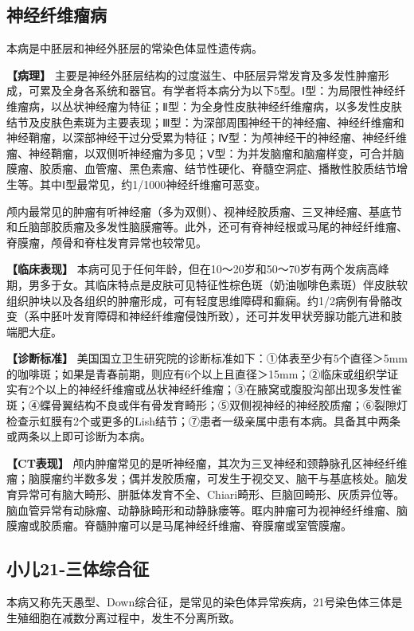 \subsection{神经纤维瘤病}

本病是中胚层和神经外胚层的常染色体显性遗传病。

\textbf{【病理】}
主要是神经外胚层结构的过度滋生、中胚层异常发育及多发性肿瘤形成，可累及全身各系统和器官。有学者将本病分为以下5型。Ⅰ型：为局限性神经纤维瘤病，以丛状神经瘤为特征；Ⅱ型：为全身性皮肤神经纤维瘤病，以多发性皮肤结节及皮肤色素斑为主要表现；Ⅲ型：为深部周围神经干的神经瘤、神经纤维瘤和神经鞘瘤，以深部神经干过分受累为特征；Ⅳ型：为颅神经干的神经瘤、神经纤维瘤、神经鞘瘤，以双侧听神经瘤为多见；Ⅴ型：为并发脑瘤和脑瘤样变，可合并脑膜瘤、胶质瘤、血管瘤、黑色素瘤、结节性硬化、脊髓空洞症、播散性胶质结节增生等。其中Ⅰ型最常见，约1/1000神经纤维瘤可恶变。

颅内最常见的肿瘤有听神经瘤（多为双侧）、视神经胶质瘤、三叉神经瘤、基底节和丘脑部胶质瘤及多发性脑膜瘤等。此外，还可有脊神经根或马尾的神经纤维瘤、脊膜瘤，颅骨和脊柱发育异常也较常见。

\textbf{【临床表现】}
本病可见于任何年龄，但在10～20岁和50～70岁有两个发病高峰期，男多于女。其临床特点是皮肤可见特征性棕色斑（奶油咖啡色素斑）伴皮肤软组织肿块以及各组织的肿瘤形成，可有轻度思维障碍和癫痫。约1/2病例有骨骼改变（系中胚叶发育障碍和神经纤维瘤侵蚀所致），还可并发甲状旁腺功能亢进和肢端肥大症。

\textbf{【诊断标准】}
美国国立卫生研究院的诊断标准如下：①体表至少有5个直径＞5mm的咖啡斑；如果是青春前期，则应有6个以上且直径＞15mm；②临床或组织学证实有2个以上的神经纤维瘤或丛状神经纤维瘤；③在腋窝或腹股沟部出现多发性雀斑；④蝶骨翼结构不良或伴有骨发育畸形；⑤双侧视神经的神经胶质瘤；⑥裂隙灯检查示虹膜有2个或更多的Lish结节；⑦患者一级亲属中患有本病。具备其中两条或两条以上即可诊断为本病。

\textbf{【CT表现】}
颅内肿瘤常见的是听神经瘤，其次为三叉神经和颈静脉孔区神经纤维瘤；脑膜瘤约半数多发；偶并发胶质瘤，可发生于视交叉、脑干与基底核处。脑发育异常可有脑大畸形、胼胝体发育不全、Chiari畸形、巨脑回畸形、灰质异位等。脑血管异常有动脉瘤、动静脉畸形和动静脉瘘等。眶内肿瘤可为视神经纤维瘤、脑膜瘤或胶质瘤。脊髓肿瘤可以是马尾神经纤维瘤、脊膜瘤或室管膜瘤。

\subsection{小儿21-三体综合征}

本病又称先天愚型、Down综合征，是常见的染色体异常疾病，21号染色体三体是生殖细胞在减数分离过程中，发生不分离所致。

